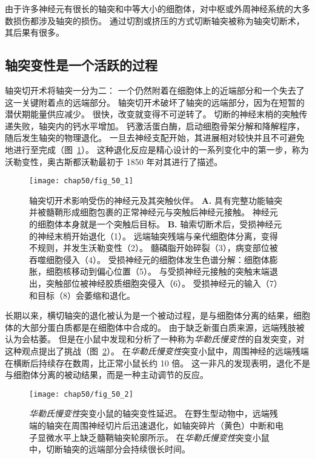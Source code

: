 由于许多神经元有很长的轴突和中等大小的细胞体，对中枢或外周神经系统的大多数损伤都涉及轴突的损伤。
通过切割或挤压的方式切断轴突被称为轴突切断术，其后果有很多。

\subsection{轴突变性是一个活跃的过程}

轴突切开术将轴突一分为二：
一个仍然附着在细胞体上的近端部分和一个失去了这一关键附着点的远端部分。
轴突切开术破坏了轴突的远端部分，因为在短暂的潜伏期能量供应减少。
很快，改变就变得不可逆转了。
切断的神经末梢的突触传递失败，轴突内的钙水平增加。
钙激活蛋白酶，启动细胞骨架分解和降解程序，随后发生轴突的物理退化。
一旦去神经支配开始，其进展相对较快并且不可避免地进行至完成（图~\ref{fig:50_1}）。
这种退化反应是精心设计的一系列变化中的第一步，称为沃勒变性，奥古斯都沃勒最初于 1850 年对其进行了描述。


\begin{figure}[htbp]
	\centering
	\texttt{[image: chap50/fig\_50\_1]}
	\caption{轴突切开术影响受伤的神经元及其突触伙伴。
		\textbf{A.} 具有完整功能轴突并被髓鞘形成细胞包裹的正常神经元与突触后神经元接触。
		神经元的细胞体本身就是一个突触后目标。
		\textbf{B.} 轴索切断术后，受损神经元的神经末梢开始退化（1）。
		远端轴突残端与亲代细胞体分离，变得不规则，并发生沃勒变性（2）。
		髓磷脂开始碎裂（3），病变部位被吞噬细胞侵入（4）。
		受损神经元的细胞体发生色谱分解：细胞体膨胀，细胞核移动到偏心位置（5）。
		与受损神经元接触的突触末端退出，突触部位被神经胶质细胞突侵入（6）。
		受损神经元的输入（7）和目标（8）会萎缩和退化。}
	\label{fig:50_1}
\end{figure}


长期以来，横切轴突的退化被认为是一个被动过程，是与细胞体分离的结果，细胞体的大部分蛋白质都是在细胞体中合成的。
由于缺乏新蛋白质来源，远端残肢被认为会枯萎。
但是在小鼠中发现和分析了一种称为\textit{华勒氏慢变性}的自发突变，对这种观点提出了挑战（图~\ref{fig:50_2}）。 
在\textit{华勒氏慢变性}突变小鼠中，周围神经的远端残端在横断后持续存在数周，比正常小鼠长约 10 倍。
这一非凡的发现表明，退化不是与细胞体分离的被动结果，而是一种主动调节的反应。


\begin{figure}[htbp]
	\centering
	\texttt{[image: chap50/fig\_50\_2]}
	\caption{\textit{华勒氏慢变性}突变小鼠的轴突变性延迟。
		在野生型动物中，远端残端的轴突在周围神经切片后迅速退化，如轴突碎片（黄色）中断和电子显微水平上缺乏髓鞘轴突轮廓所示。
		在\textit{华勒氏慢变性}突变小鼠中，切断轴突的远端部分会持续很长时间\cite{beirowski2004quantitative}。}
	\label{fig:50_2}
\end{figure}



